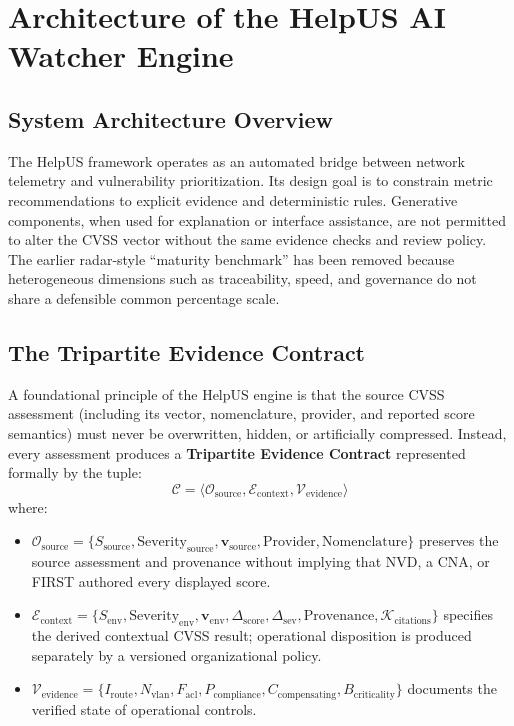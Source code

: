 \chapter{Architecture of the HelpUS AI Watcher Engine}
\label{chap:architecture}

\section{System Architecture Overview}
The HelpUS framework operates as an automated bridge between network telemetry and vulnerability prioritization. Its design goal is to constrain metric recommendations to explicit evidence and deterministic rules. Generative components, when used for explanation or interface assistance, are not permitted to alter the CVSS vector without the same evidence checks and review policy. The earlier radar-style ``maturity benchmark'' has been removed because heterogeneous dimensions such as traceability, speed, and governance do not share a defensible common percentage scale.

\section{The Tripartite Evidence Contract}
A foundational principle of the HelpUS engine is that the source CVSS assessment (including its vector, nomenclature, provider, and reported score semantics) must never be overwritten, hidden, or artificially compressed. Instead, every assessment produces a \textbf{Tripartite Evidence Contract} represented formally by the tuple:
\begin{equation}
    \mathcal{C} = \langle \mathcal{O}_{\text{source}}, \mathcal{E}_{\text{context}}, \mathcal{V}_{\text{evidence}} \rangle
\end{equation}
where:
\begin{itemize}
    \item $\mathcal{O}_{\text{source}} = \{S_{\text{source}}, \text{Severity}_{\text{source}}, \mathbf{v}_{\text{source}}, \text{Provider}, \text{Nomenclature}\}$ preserves the source assessment and provenance without implying that NVD, a CNA, or FIRST authored every displayed score.
    \item $\mathcal{E}_{\text{context}} = \{S_{\text{env}}, \text{Severity}_{\text{env}}, \mathbf{v}_{\text{env}}, \Delta_{\text{score}}, \Delta_{\text{sev}}, \text{Provenance}, \mathcal{K}_{\text{citations}}\}$ specifies the derived contextual CVSS result; operational disposition is produced separately by a versioned organizational policy.
    \item $\mathcal{V}_{\text{evidence}} = \{I_{\text{route}}, N_{\text{vlan}}, F_{\text{acl}}, P_{\text{compliance}}, C_{\text{compensating}}, B_{\text{criticality}}\}$ documents the verified state of operational controls.
\end{itemize}

